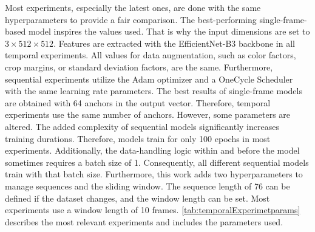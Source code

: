 Most experiments, especially the latest ones, are done with the same hyperparameters to provide a fair comparison.
The best-performing single-frame-based model inspires the values used.
That is why the input dimensions are set to $3 \times 512 \times 512$.
Features are extracted with the EfficientNet-B3 backbone in all temporal experiments.
All values for data augmentation, such as color factors, crop margins, or standard deviation factors, are the same.
Furthermore, sequential experiments utilize the Adam optimizer \cite{pytorchAdamOptimizer} and a OneCycle Scheduler \cite{pytorch_oneCycleLR_docu} with the same learning rate parameters.
The best results of single-frame models are obtained with 64 anchors in the output vector.
Therefore, temporal experiments use the same number of anchors.
However, some parameters are altered.
The added complexity of sequential models significantly increases training durations.
Therefore, models train for only 100 epochs in most experiments.
Additionally, the data-handling logic within and before the model sometimes requires a batch size of 1.
Consequently, all different sequential models train with that batch size.
Furthermore, this work adds two hyperparameters to manage sequences and the sliding window.
The sequence length of 76 can be defined if the dataset changes, and the window length can be set.
Most experiments use a window length of 10 frames.
\autoref{tab:temporalExperimetparams} describes the most relevant experiments and includes the parameters used.

